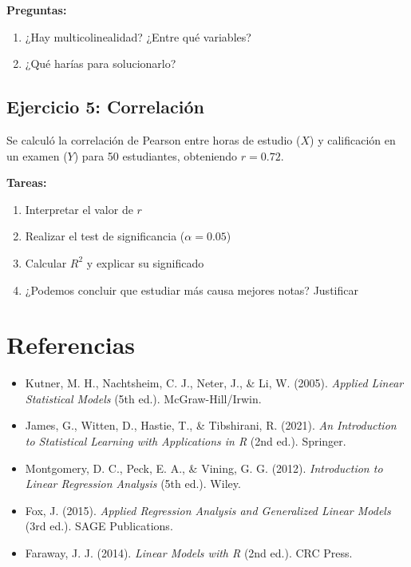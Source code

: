 \documentclass[11pt,a4paper]{article}
\begin{document}
\textbf{Preguntas:}
\begin{enumerate}
    \item ¿Hay multicolinealidad? ¿Entre qué variables?
    \item ¿Qué harías para solucionarlo?
\end{enumerate}

\subsection{Ejercicio 5: Correlación}

Se calculó la correlación de Pearson entre horas de estudio ($X$) y calificación en un examen ($Y$) para 50 estudiantes, obteniendo $r = 0.72$.

\textbf{Tareas:}
\begin{enumerate}
    \item Interpretar el valor de $r$
    \item Realizar el test de significancia ($\alpha = 0.05$)
    \item Calcular $R^2$ y explicar su significado
    \item ¿Podemos concluir que estudiar más causa mejores notas? Justificar
\end{enumerate}

\section{Referencias}

\begin{itemize}
    \item Kutner, M. H., Nachtsheim, C. J., Neter, J., \& Li, W. (2005). \textit{Applied Linear Statistical Models} (5th ed.). McGraw-Hill/Irwin.
    \item James, G., Witten, D., Hastie, T., \& Tibshirani, R. (2021). \textit{An Introduction to Statistical Learning with Applications in R} (2nd ed.). Springer.
    \item Montgomery, D. C., Peck, E. A., \& Vining, G. G. (2012). \textit{Introduction to Linear Regression Analysis} (5th ed.). Wiley.
    \item Fox, J. (2015). \textit{Applied Regression Analysis and Generalized Linear Models} (3rd ed.). SAGE Publications.
    \item Faraway, J. J. (2014). \textit{Linear Models with R} (2nd ed.). CRC Press.
\end{itemize}
\end{document}
